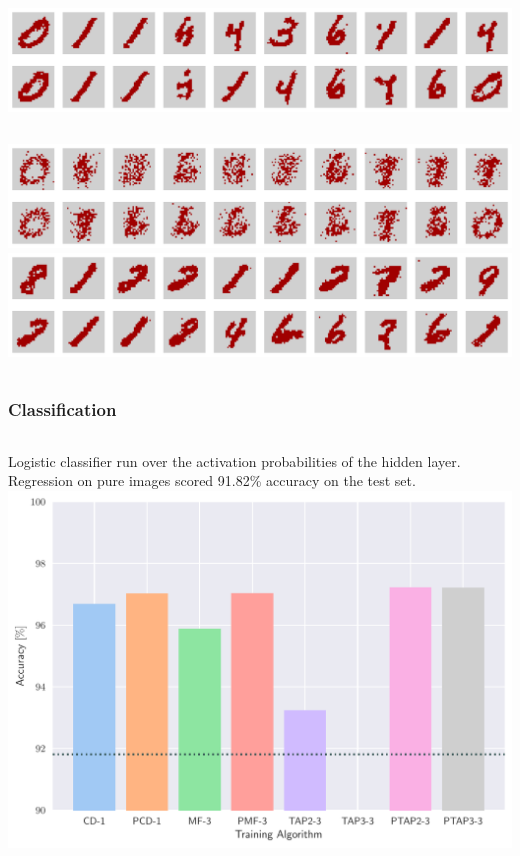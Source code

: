 \begin{frame}
\begin{columns}
    \centering
    \includegraphics[width=\linewidth]{img/numerical-experiments/stability-ptap2-3.pdf}
  \end{columns}
  \vspace{5pt}
  \begin{columns}
    \centering
    \includegraphics[width=\textwidth]{img/numerical-experiments/stability-tap3-3.pdf}
    \centering
    \includegraphics[width=\linewidth]{img/numerical-experiments/stability-ptap3-3.pdf}
  \end{columns}
\end{frame}

\begin{frame}
  \frametitle{Classification}
  \begin{columns}
       \alert{Logistic classifier} run over the activation probabilities of the hidden layer.\\
        Regression on pure images scored 91.82\% accuracy on the test set.
      \includegraphics[width=\linewidth]{img/numerical-experiments/acc-hist.pdf}
  \end{columns}
\end{frame}

